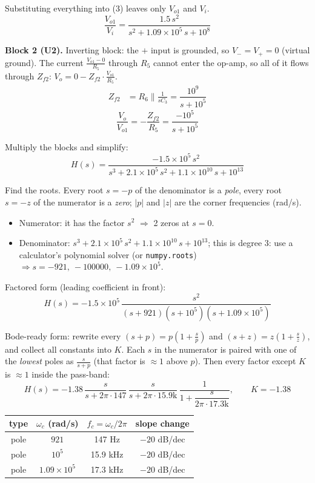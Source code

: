 \documentclass[11pt]{article}
\newcommand{\solstep}[2]{\par\medskip{\color{stepc}\textbf{Step #1 --- #2}}\par\nopagebreak}
\begin{document}
Substituting everything into (3) leaves only $V_{o1}$ and $V_i$.\[
\frac{V_{o1}}{V_i} = \dfrac{1.5\,s^{2}}{s^{2} + 1.09\times 10^{5}\,s + 10^{8}}
\]

\textbf{Block 2 (U2).} Inverting block: the $+$ input is grounded, so $V_- = V_+ = 0$ (virtual ground). The current $\frac{V_{o1} - 0}{R_{5}}$ through $R_{5}$ cannot enter the op-amp, so all of it flows through $Z_{f2}$: $V_{o} = 0 - Z_{f2}\cdot\frac{V_{o1}}{R_{5}}$.\begin{align*}
Z_{f2} &= R_{6} \parallel \frac{1}{sC_{3}} = \dfrac{10^{9}}{s + 10^{5}}
\end{align*}
\[
\frac{V_{o}}{V_{o1}} = -\frac{Z_{f2}}{R_{5}} = \dfrac{-10^{5}}{s + 10^{5}}
\]

Multiply the blocks and simplify:\[
H(s) = \dfrac{-1.5\times 10^{5}\,s^{2}}{s^{3} + 2.1\times 10^{5}\,s^{2} + 1.1\times 10^{10}\,s + 10^{13}}
\]

\solstep{5}{Standard (Bode-ready) form}Find the roots. Every root $s=-p$ of the denominator is a \emph{pole}, every root $s=-z$ of the numerator is a \emph{zero}; $|p|$ and $|z|$ are the corner frequencies (rad/s).
\begin{itemize}[leftmargin=*,itemsep=2pt]
\item Numerator: it has the factor $s^2$ $\Rightarrow$ 2 zeros at $s=0$.
\item Denominator: $s^{3} + 2.1\times 10^{5}\,s^{2} + 1.1\times 10^{10}\,s + 10^{13}$; this is degree 3: use a calculator's polynomial solver (or \texttt{numpy.roots}) $\Rightarrow s = -921,\ -100000,\ -1.09\times 10^{5}$.
\end{itemize}

Factored form (leading coefficient in front):
\[
H(s) = -1.5\times 10^{5}\,\dfrac{s^{2}}{(s+921)(s+10^{5})(s+1.09\times 10^{5})}
\]

Bode-ready form: rewrite every $(s+p) = p\left(1+\frac{s}{p}\right)$ and $(s+z) = z\left(1+\frac{s}{z}\right)$, and collect all constants into $K$. Each $s$ in the numerator is paired with one of the \emph{lowest} poles as $\frac{s}{s+p}$ (that factor is $\approx 1$ above $p$). Then every factor except $K$ is $\approx 1$ inside the pass-band:
\[
H(s) = -1.38\,\dfrac{s}{s+2\pi\cdot 147}\,\dfrac{s}{s+2\pi\cdot 15.9\mathrm{k}}\,\dfrac{1}{1+\dfrac{s}{2\pi\cdot 17.3\mathrm{k}}},\qquad K = -1.38
\]

\begin{center}\renewcommand{\arraystretch}{1.35}
\begin{tabular}{cccc}
\toprule
type & $\omega_c$ (rad/s) & $f_c=\omega_c/2\pi$ & slope change \\
\midrule
pole & $921$ & 147 Hz & $-20$ dB/dec \\
pole & $10^{5}$ & 15.9 kHz & $-20$ dB/dec \\
pole & $1.09\times 10^{5}$ & 17.3 kHz & $-20$ dB/dec \\
\bottomrule
\end{tabular}\end{center}
\end{document}
